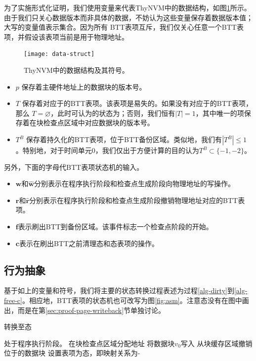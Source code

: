 为了实施形式化证明，我们使用变量来代表ThyNVM中的数据结构，如图\ref{fig-data-struct}所示。由于我们只关心数据版本而非具体的数据，不妨认为这些变量保存着数据版本值；大写的变量值表示集合。因为所有 BTT表项互斥，我们仅关心任意一个BTT表项，并假设该表项当前是用于物理地址。

\begin{figure}[!t]
\centering
\texttt{[image: data-struct]}
\caption{ThyNVM中的数据结构及其符号。}
\label{fig-data-struct}
\end{figure}

\begin{itemize}
\item $p$ 保存着主硬件地址上的数据块的版本号。
\item $T$ 保存着对应于的BTT表项。该表项是易失的。如果没有对应于的BTT表项，那么
$T=\varnothing$，此时可认为的状态为；否则，我们恒有$\left\vert{T}\right\vert = 1$，其中唯一的项保存着在块检查点区域中对应数据块的版本号。
\item $T^B$ 保存着持久化的BTT表项，位于BTT备份区域。类似地，我们有$\left\vert{T^B}\right\vert \le 1$。特别地，对于时间单元$0$，我们仅出于方便计算的目的认为$T^B \subset \{-1, -2\}$。
\end{itemize}

另外，下面的字母代BTT表项状态机的输入。

\begin{itemize}
\item $\mathbf{w}$和$\mathbf{\hat{w}}$分别表示在程序执行阶段和检查点生成阶段向物理地址的写操作。
\item $\mathbf{r}$和$\mathbf{\hat{r}}$分别表示在程序执行阶段和检查点生成阶段撤销物理地址对应的BTT表项。
\item $\mathbf{f}$表示刷出BTT到备份区域。该事件标志一个检查点阶段的开始。
\item $\mathbf{c}$表示在刷出BTT之前清理态和态表项的操作。
\end{itemize}

\subsection{行为抽象}

基于如上的变量和符号，我们将主要的状态转换过程表述为过程\ref{alg-dirty}到\ref{alg-free-c}。相应地，BTT表项的状态机也可改写为图\ref{fig:asm}。注意态没有在图中画出，而是在第\ref{sec:proof-page-writeback}节单独讨论。

\begin{algorithm} [!h]
\caption{转换至态}
\label{alg-dirty}
\begin{algorithmic}[1]
\Require 处于程序执行阶段。
\State 在块检查点区域分配地址
\State 将数据块$v_0$写入
  \State 从块缓存区域撤销位于的数据块
\EndIf
\State 设置表项为态，即映射关系为- 
\end{algorithmic}
\end{algorithm}

